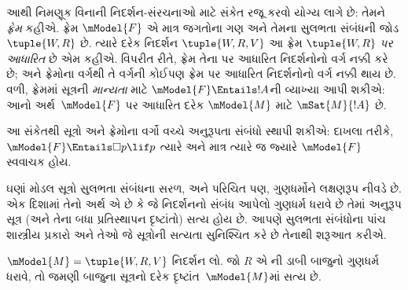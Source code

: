 આથી નિમણૂક વિનાની નિદર્શન-સંરચનાઓ માટે સંકેત
રજૂ કરવો યોગ્ય લાગે છે: તેમને \emph{ફ્રેમ} કહીએ.
ફ્રેમ $\mModel{F}$ એ માત્ર જગતોના ગણ અને તેમના
સુલભતા સંબંધની જોડ $\tuple{W, R}$ છે. ત્યારે
દરેક નિદર્શન $\tuple{W, R, V}$ આ ફ્રેમ
$\tuple{W, R}$ \emph{પર આધારિત} છે એમ કહીએ.
વિપરીત રીતે, ફ્રેમ તેના પર આધારિત નિદર્શનોનો
વર્ગ નક્કી કરે છે; અને ફ્રેમોના વર્ગથી તે વર્ગની
કોઈપણ ફ્રેમ પર આધારિત નિદર્શનોનો વર્ગ નક્કી થાય છે.
વળી, ફ્રેમમાં સૂત્રની \emph{માન્યતા} માટે
$\mModel{F} \Entails !A$ની વ્યાખ્યા આપી શકીએ: આનો
અર્થ~$\mModel{F}$ પર આધારિત દરેક $\mModel{M}$ માટે
$\mSat{M}{!A}$ છે.

આ સંકેતથી સૂત્રો અને ફ્રેમોના વર્ગો વચ્ચે
અનુરૂપતા સંબંધો સ્થાપી શકીએ: દાખલા તરીકે,
$\mModel{F} \Entails \Box p \lif p$ ત્યારે અને માત્ર
ત્યારે જ જ્યારે $\mModel{F}$ સ્વવાચક હોય.
\endgroup

\begingroup
\makeatletter{}\makeatother


\label{guunit:OLP-0421}


ઘણાં મોડલ સૂત્રો સુલભતા સંબંધના સરળ, અને
પરિચિત પણ, ગુણધર્મોને લક્ષણરૂપ નીવડે છે. એક
દિશામાં તેનો અર્થ એ છે કે જે નિદર્શનનો સંબંધ
આપેલો ગુણધર્મ ધરાવે છે તેમાં અનુરૂપ સૂત્ર
(અને તેના બધા પ્રતિસ્થાપન દૃષ્ટાંતો) સત્ય હોય છે.
આપણે સુલભતા સંબંધોના પાંચ શાસ્ત્રીય પ્રકારો
અને તેઓ જે સૂત્રોની સત્યતા સુનિશ્ચિત કરે છે
તેનાથી શરૂઆત કરીએ.

\begin{thm}
  $\mModel{M} = \tuple{W, R, V}$ નિદર્શન લો.
  જો $R$ એ ની ડાબી બાજુનો ગુણધર્મ
  ધરાવે, તો જમણી બાજુના સૂત્રનો દરેક
  દૃષ્ટાંત~$\mModel{M}$માં સત્ય છે.
\end{thm}

